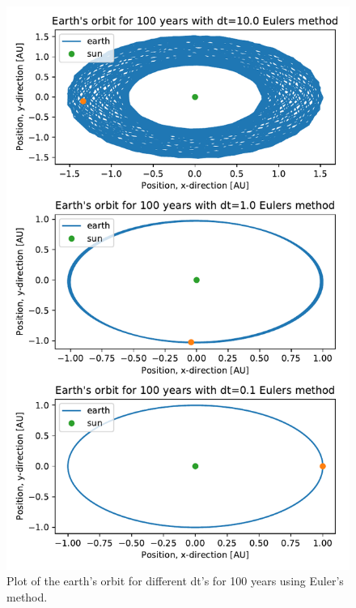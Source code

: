 \begin{figure}[H]
\includegraphics[width=1\linewidth]{../results/plots/different_timesteps_Eulers_method.pdf}\caption{Plot of the earth's orbit for different dt's for 100 years using Euler's method.}\label{fig:timesteps-euler}
\end{figure}		


